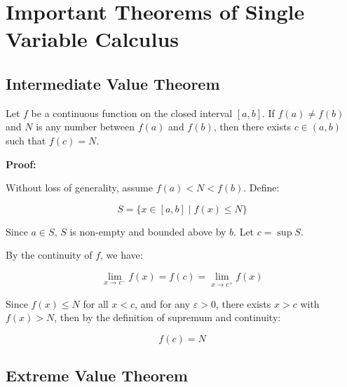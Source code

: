 \newpage
\section{Important Theorems of Single Variable Calculus}

\subsection{Intermediate Value Theorem}

Let \( f \) be a continuous function on the closed interval \([a, b]\). If \( f(a) \ne f(b) \) 
and \( N \) is any number between \( f(a) \) and \( f(b) \), then there exists \( c \in (a, b) \) 
such that \( f(c) = N \).
\vspace{\baselineskip}

\textbf{Proof:}  

Without loss of generality, assume \( f(a) < N < f(b) \).  
Define:

\[
    S = \{ x \in [a, b] \mid f(x) \le N \}
\]

Since \( a \in S \), \( S \) is non-empty and bounded above by \( b \). Let \( c = \sup S \).

By the continuity of \( f \), we have:

\[
    \lim_{x \to c^-} f(x) = f(c) = \lim_{x \to c^+} f(x)
\]

Since \( f(x) \le N \) for all \( x < c \), and for any \( \varepsilon > 0 \), 
there exists \( x > c \) with \( f(x) > N \), then by the definition of supremum and continuity:

\[
    f(c) = N
\]

\QED

\begin{center}
\end{center}

\subsection{Extreme Value Theorem}

